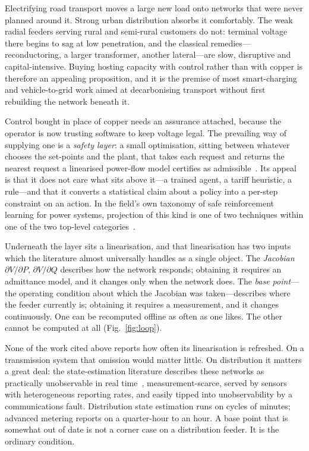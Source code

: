 \documentclass[conference,a4paper]{IEEEtran}
\begin{document}
Electrifying road transport moves a large new load onto networks that were never
planned around it. Strong urban distribution absorbs it comfortably. The weak
radial feeders serving rural and semi-rural customers do not: terminal voltage
there begins to sag at low penetration, and the classical remedies---%
reconductoring, a larger transformer, another lateral---are slow, disruptive and
capital-intensive. Buying hosting capacity with control rather than with copper
is therefore an appealing proposition, and it is the premise of most
smart-charging and vehicle-to-grid work aimed at decarbonising transport without
first rebuilding the network beneath it.

Control bought in place of copper needs an assurance attached, because the
operator is now trusting software to keep voltage legal. The prevailing way of
supplying one is a \emph{safety layer}: a small optimisation, sitting between
whatever chooses the set-points and the plant, that takes each request and
returns the nearest request a linearised power-flow model certifies as
admissible~\cite{dalal2018,aamas2023,kou2022,gan2023,bigat2026,evsafe2024}. Its
appeal is that it does not care what sits above it---a trained agent, a tariff
heuristic, a rule---and that it converts a statistical claim about a policy into
a per-step constraint on an action. In the field's own taxonomy of safe
reinforcement learning for power systems, projection of this kind is one of two
techniques within one of the two top-level categories~\cite{saferlreview}.

Underneath the layer sits a linearisation, and that linearisation has two inputs
which the literature almost universally handles as a single object. The
\emph{Jacobian} $\partial V/\partial P$, $\partial V/\partial Q$ describes how
the network responds; obtaining it requires an admittance model, and it changes
only when the network does. The \emph{base point}---the operating condition about
which the Jacobian was taken---describes where the feeder currently is; obtaining
it requires a measurement, and it changes continuously. One can be recomputed
offline as often as one likes. The other cannot be computed at all (Fig.~\ref{fig:loop}).

None of the work cited above reports how often its linearisation is refreshed.
On a transmission system that omission would matter little. On distribution it
matters a great deal: the state-estimation literature describes these networks as
practically unobservable in real time~\cite{dsse_survey}, measurement-scarce,
served by sensors with heterogeneous reporting rates, and easily tipped into
unobservability by a communications fault. Distribution state estimation runs on
cycles of minutes; advanced metering reports on a quarter-hour to an hour. A base
point that is somewhat out of date is not a corner case on a distribution feeder.
It is the ordinary condition.
\end{document}
